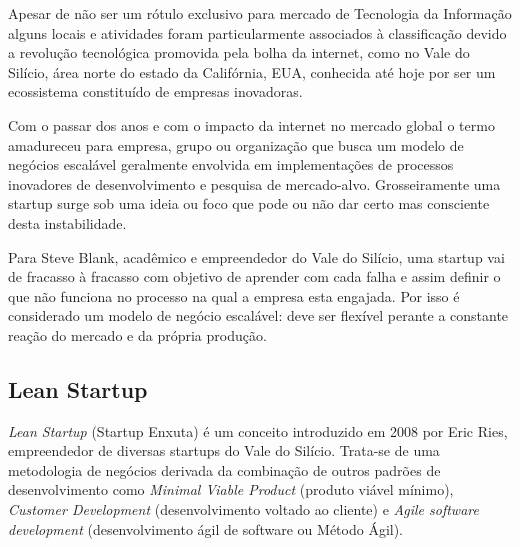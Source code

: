 \par Apesar de não ser um rótulo exclusivo para mercado de Tecnologia da Informação alguns locais e atividades foram particularmente associados à classificação devido a revolução tecnológica promovida pela bolha da internet, como no Vale do Silício, área norte do estado da Califórnia, EUA, conhecida até hoje por ser um ecossistema constituído de empresas inovadoras.
\par Com o passar dos anos e com o impacto da internet no mercado global o termo amadureceu para empresa, grupo ou organização que busca um modelo de negócios escalável geralmente envolvida em implementações de processos inovadores de desenvolvimento e pesquisa de mercado-alvo. Grosseiramente uma startup surge sob uma ideia ou foco que pode ou não dar certo mas consciente desta instabilidade.
\par Para Steve Blank, acadêmico e empreendedor do Vale do Silício, uma startup vai de fracasso à fracasso com objetivo de aprender com cada falha e assim definir o que não funciona no processo na qual a empresa esta engajada. Por isso é considerado um modelo de negócio escalável: deve ser flexível perante a constante reação do mercado e da própria produção.

\subsection{Lean Startup}
\par \emph{Lean Startup} (Startup Enxuta) é um conceito introduzido em 2008 por Eric Ries, empreendedor de diversas startups do Vale do Silício. Trata-se de uma metodologia de negócios derivada da combinação de outros padrões de desenvolvimento como \emph{Minimal Viable Product} (produto viável mínimo), \emph{Customer Development} (desenvolvimento voltado ao cliente) e \emph{Agile software development} (desenvolvimento ágil de software ou Método Ágil).

